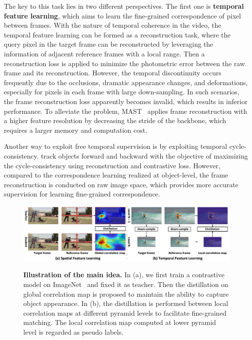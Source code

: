 \documentclass{article}
\begin{document}
The key to this task lies in two different perspectives. The first one is \textbf{temporal feature learning}, which aims to learn the fine-grained correspondence of pixel between frames. With the nature of temporal coherence in the video, the temporal feature learning can be formed as a reconstruction task, where the query pixel in the target frame can be reconstructed by leveraging the information of adjacent reference frames with a local range. Then a reconstruction loss is applied to minimize the photometric error between the raw frame and its reconstruction. However, the temporal discontinuity occurs frequently due to the occlusions, dramatic appearance changes, and deformations, especially for pixels in each frame with large down-sampling. In such scenarios, the frame reconstruction loss apparently becomes invalid, which results in inferior performance. To alleviate the problem, MAST~\cite{lai2020mast} applies frame reconstruction with a higher feature resolution by decreasing the stride of the backbone, which requires a larger memory and computation cost. 

Another way to exploit free temporal supervision is by exploiting temporal cycle-consistency.  \cite{jabri2020space}\cite{wang2019learning} track objects forward and backward with the objective of maximizing the cycle-consistency using  reconstruction and contrastive loss. However, compared to the correspondence learning realized at object-level, the frame reconstruction is conducted on raw image space, which provides more accurate supervision for learning fine-grained correspondence.

\begin{figure}[!tb]
  \centering
  {\includegraphics[width=1.0\textwidth]{figure/tissor/tissor.pdf}}
  \caption{\small \textbf{Illustration of the main idea.} In (a), we first train a contrastive model on ImageNet~\cite{deng2009large} and fixed it as teacher. Then the distillation on global correlation map is proposed to maintain the ability to capture object appearance. In (b), the distillation is performed between local correlation maps at different pyramid levels to facilitate fine-grained matching. The local correlation map computed at lower pyramid level is regarded as pseudo labels.}
  \label{fig:tissor}
  \vspace{-6mm}
\end{figure}
\end{document}
